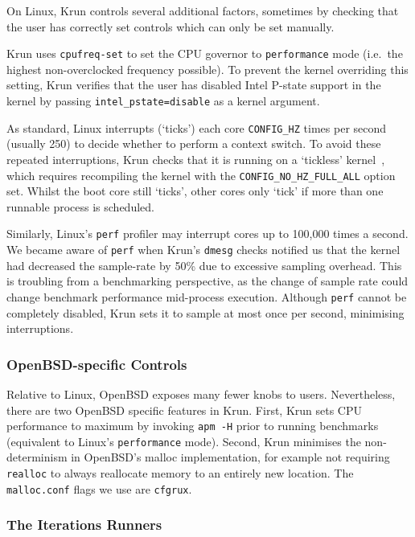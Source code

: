 \documentclass[acmlarge]{acmart}\settopmatter{printfolios=true}
\newcommand{\krun}{Krun\xspace}
\begin{document}
On Linux, \krun controls several additional factors, sometimes by checking that
the user has correctly set controls which can only be set manually.

\krun uses \texttt{cpufreq-set} to set the CPU governor to \texttt{performance} mode
(i.e.~the highest non-overclocked frequency possible).
To prevent the kernel overriding this setting, \krun verifies that the user has disabled
Intel P-state support in the kernel by passing
\texttt{intel\_pstate=disable} as a kernel argument.

As standard, Linux interrupts (`ticks') each core
\texttt{CONFIG\-\_HZ} times per second (usually 250) to
decide whether to perform a context switch. To avoid these repeated
interruptions, \krun checks that it is running on a `tickless'
kernel~\cite{tickless}, which requires recompiling the kernel with the
\texttt{CONFIG\_NO\_HZ\_FULL\_ALL} option set. Whilst the boot core still
`ticks', other cores only `tick' if more than one runnable process is scheduled.

Similarly, Linux's \texttt{perf} profiler may interrupt cores up to 100,000 times a
second. We became aware of \texttt{perf} when \krun's \texttt{dmesg} checks
notified us that the kernel had decreased the sample-rate by
50\% due to excessive sampling overhead. This is troubling
from a benchmarking perspective, as the change of sample rate could change
benchmark performance mid-process execution. Although
\texttt{perf} cannot be completely disabled, \krun sets it to sample at most
once per second, minimising interruptions.


\subsubsection{OpenBSD-specific Controls}

Relative to Linux, OpenBSD exposes many fewer knobs to users. Nevertheless,
there are two OpenBSD specific features in \krun.
First, \krun sets CPU performance to maximum by invoking \texttt{apm -H} prior
to running benchmarks (equivalent to Linux's \texttt{performance} mode).
Second, \krun minimises the non-determinism in OpenBSD's malloc implementation,
for example not requiring \texttt{realloc} to always reallocate memory to
an entirely new location. The \texttt{malloc.conf} flags we use are \texttt{cfgrux}.


\subsubsection{The Iterations Runners}
\end{document}
